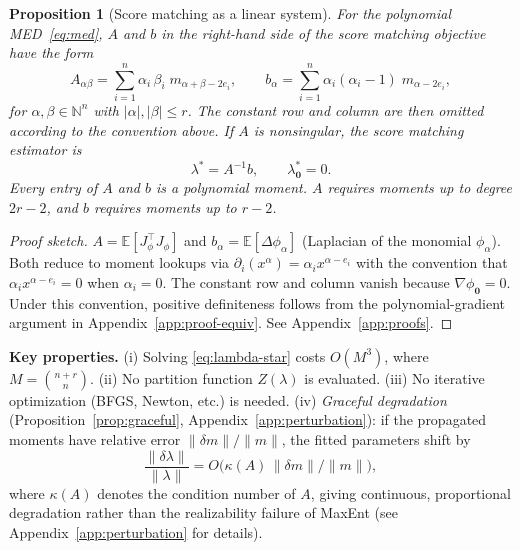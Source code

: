 \documentclass{article}
\newcommand{\N}{\mathbb{N}}
\newcommand{\E}{\mathbb{E}}
\newtheorem{proposition}{Proposition}
\theoremstyle{definition}
\begin{document}
\begin{proposition}[Score matching as a linear system]\label{prop:sm}
For the polynomial MED~\eqref{eq:med}, $A$ and $b$ in the right-hand side of the score matching objective have the form
\begin{equation}\label{eq:Ab}
    A_{\alpha\beta} = \sum_{i=1}^n \alpha_i\,\beta_i\; m_{\alpha+\beta-2e_i},
    \qquad
    b_\alpha = \sum_{i=1}^n \alpha_i(\alpha_i{-}1)\; m_{\alpha-2e_i},
\end{equation}
for $\alpha, \beta \in \N^n$ with $|\alpha|, |\beta| \le r$.
The constant row and column are then omitted according to the convention
above. If $A$ is nonsingular, the score matching estimator is
\begin{equation}\label{eq:lambda-star}
    \lambda^* = A^{-1}b,
    \qquad
    \lambda^*_{\mathbf{0}}=0 .
\end{equation}
Every entry of $A$ and $b$ is a polynomial moment.
$A$ requires moments up to degree $2r{-}2$, and $b$ requires moments up to $r{-}2$.
\end{proposition}

\begin{proof}[Proof sketch]
$A = \E[J_\phi^\top J_\phi]$ and $b_\alpha = \E[\Delta\phi_\alpha]$
(Laplacian of the monomial $\phi_\alpha$).
Both reduce to moment lookups via $\partial_i(x^\alpha) = \alpha_i x^{\alpha-e_i}$ with the convention that $\alpha_i x^{\alpha - e_i} = 0$ when $\alpha_i = 0$.
The constant row and column vanish because $\nabla \phi_{\mathbf{0}} = 0$.
Under this convention, positive definiteness follows from the
polynomial-gradient argument in Appendix~\ref{app:proof-equiv}.
See Appendix~\ref{app:proofs}.
\end{proof}

\textbf{Key properties.}
(i) Solving \eqref{eq:lambda-star} costs $O(M^3)$, where $M = \binom{n+r}{n}$.
(ii) No partition function $Z(\lambda)$ is evaluated.
(iii) No iterative optimization (BFGS, Newton, etc.) is needed.
(iv) \emph{Graceful degradation} (Proposition~\ref{prop:graceful},
Appendix~\ref{app:perturbation}):
if the propagated moments have relative error
$\|\delta m\|/\|m\|$, the fitted parameters shift by
\begin{equation}\label{eq:graceful}
    \frac{\|\delta\lambda\|}{\|\lambda\|}
    = O\bigl(\kappa(A)\, \|\delta m\| / \|m\|\bigr),
\end{equation}
where $\kappa(A)$ denotes the condition number of $A$,
giving continuous, proportional degradation
rather than the realizability failure of MaxEnt
(see Appendix~\ref{app:perturbation} for details).
\end{document}
